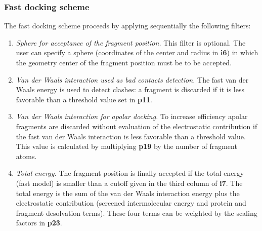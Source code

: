 \documentclass[a4paper,12pt,titlepage]{article}
\begin{document}
\subsubsection{Fast docking scheme}
\label{sssec:fastdock}

The fast docking scheme proceeds by applying sequentially the following filters:

\begin{enumerate}

\item {\it Sphere for acceptance of the fragment position.}
This filter is optional. The user can specify a sphere (coordinates of the center and radius in 
{\bf i6}) in which the geometry center of the fragment position must be to be accepted.

\item {\it Van der Waals interaction used as bad contacts detection.}
The fast van der Waals energy is used to detect clashes: 
a fragment is discarded if it is less favorable than a threshold value set in {\bf p11}.

\item {\it Van der Waals interaction for apolar docking.}
To increase efficiency apolar fragments are discarded without evaluation of the electrostatic 
contribution if the fast van der Waals interaction is less favorable than a threshold value. This value is 
calculated by multiplying {\bf p19} by the number of fragment atoms.

\item {\it Total energy.}
The fragment position is finally accepted if the total energy (fast model) is smaller than a cutoff 
given in the 
third column of {\bf i7}. The total energy is the sum of the van der Waals interaction energy plus 
the electrostatic contribution (screened intermolecular energy and protein and fragment desolvation 
terms). These four terms can be weighted by the scaling factors in {\bf p23}.

\end{enumerate}
\end{document}
